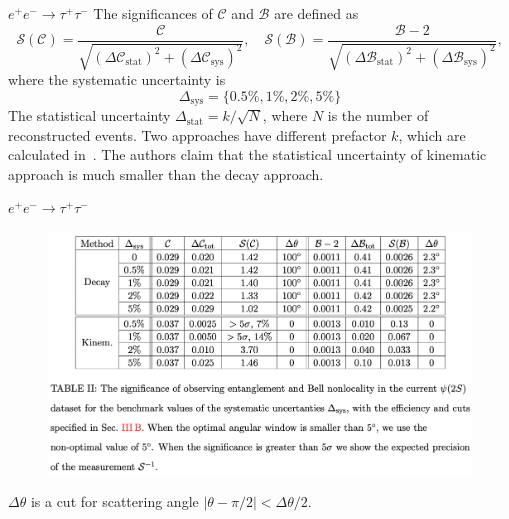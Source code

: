 \documentclass{beamer}
\begin{document}
    \begin{frame}{$e^+e^-\to \tau^+\tau^-$ \footnotesize {}}
        The significances of $\mathcal{C}$ and $\mathcal{B}$ are defined as 
        \begin{equation*}
            \mathcal{S}(\mathcal{C}) = \frac{\mathcal{C}}{\sqrt{(\Delta\mathcal{C}_{\text{stat}})^2+(\Delta\mathcal{C}_{\text{sys}})^2}}, \quad
            \mathcal{S}(\mathcal{B}) = \frac{\mathcal{B}-2}{\sqrt{(\Delta\mathcal{B}_{\text{stat}})^2+(\Delta\mathcal{B}_{\text{sys}})^2}},
        \end{equation*}
        where the systematic uncertainty is 
        \begin{equation*}
            \Delta_{\text{sys}} = \{0.5\%, 1\%, 2\%, 5\%\}
        \end{equation*}
        The statistical uncertainty $\Delta_{\text{stat}} = k/\sqrt{N}$, 
        where $N$ is the number of reconstructed events. 
        Two approaches have different prefactor $k$, which are calculated in~.
        The authors claim that the statistical uncertainty of kinematic approach is much smaller than the decay approach.
    \end{frame}

    \begin{frame}{$e^+e^-\to \tau^+\tau^-$ \footnotesize {}}
        \begin{figure}[htbp]
            \centering
            \includegraphics[width=0.8\linewidth]{img/eetautau4.png}
        \end{figure}
        $\Delta\theta$ is a cut for scattering angle $|\theta-\pi/2|<\Delta\theta/2$.
    \end{frame}
\end{document}
